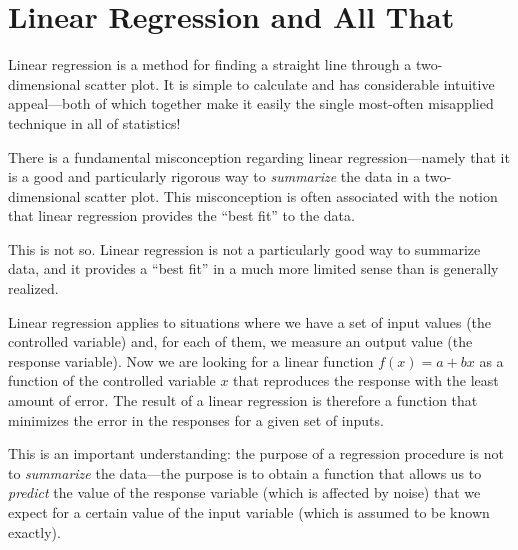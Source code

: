 \vspace*{-6pt}
\section{Linear Regression and All That}

 
Linear regression is a method for finding a straight line through
a two-dimensional scatter plot. It is simple to calculate and
has considerable intuitive appeal---both of which together make
it easily the single most-often misapplied technique in all of
statistics!

There is a fundamental misconception regarding linear
regression---namely that it is a good and particularly rigorous way to
\emph{summarize}\vadjust{\pagebreak} the data in a two-dimensional scatter plot.  This
misconception is often associated with the notion that linear
regression provides the ``best fit'' to the data.

This is not so. Linear regression is not a particularly good way to 
summarize data, and it provides a ``best fit'' in a much more limited
sense than is generally realized. 

Linear regression applies to situations where we have a set of input
values (the controlled variable) and, for each of them, we measure an
output value (the response variable).  Now we are looking for a linear
function $f(x) = a + b x$ as a function of the controlled variable $x$
that reproduces the response with the least amount of error. The
result of a linear regression is therefore a function that minimizes
the error in the responses for a given set of inputs.

This is an important understanding: the purpose of a regression
procedure is not to \emph{summarize} the data---the purpose is to
obtain a function that allows us to \emph{predict} the value of the
response variable (which is affected by noise) that we expect for a
certain value of the input variable (which is assumed to be known
exactly).

